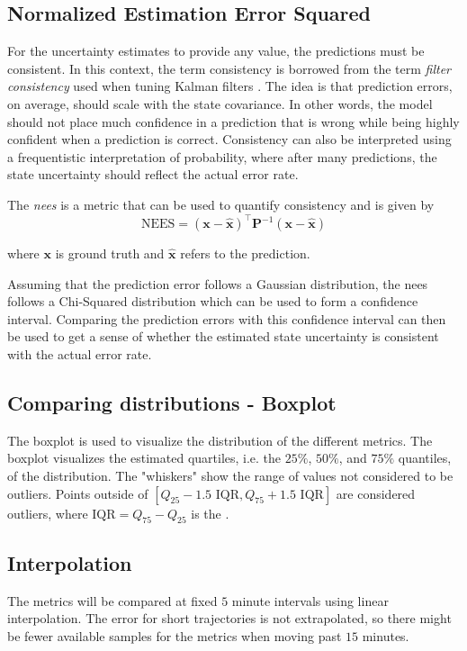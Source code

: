 \subsection{Normalized Estimation Error Squared}
For the uncertainty estimates to provide any value, the predictions must be consistent. In this context, the term consistency is borrowed from the term \textit{filter consistency} used when tuning Kalman filters \cite{sensorfusjon}. The idea is that prediction errors, on average, should scale with the state covariance. In other words, the model should not place much confidence in a prediction that is wrong while being highly confident when a prediction is correct. Consistency can also be interpreted using a frequentistic interpretation of probability, where after many predictions, the state uncertainty should reflect the actual error rate.

The \textit{\acrfull{nees}} is a metric that can be used to quantify consistency and is given by
\begin{equation}
    \text{NEES} = (\boldsymbol{x} - \hat{\boldsymbol{x}})^\intercal \boldsymbol{P}^{-1} (\boldsymbol{x} - \hat{\boldsymbol{x}})
\end{equation}

where $\boldsymbol{x}$ is ground truth and $\hat{\boldsymbol{x}}$ refers to the prediction.

Assuming that the prediction error follows a Gaussian distribution, the \acrshort{nees} follows a Chi-Squared distribution which can be used to form a confidence interval. Comparing the prediction errors with this confidence interval can then be used to get a sense of whether the estimated state uncertainty is consistent with the actual error rate.

\subsection{Comparing distributions - Boxplot}
The boxplot is used to visualize the distribution of the different metrics. The boxplot visualizes the estimated quartiles, i.e. the $25\%$, $50\%$, and $75\%$ quantiles, of the distribution. The "whiskers" show the range of values not considered to be outliers. Points outside of $[Q_{25} - 1.5 \text{ IQR}, Q_{75} + 1.5 \text{ IQR}]$ are considered outliers, where $\text{IQR} = Q_{75} - Q_{25}$ is the  \cite{matplotlib}.  

\subsection{Interpolation}
The metrics will be compared at fixed $5$ minute intervals using linear interpolation. The error for short trajectories is not extrapolated, so there might be fewer available samples for the metrics when moving past $15$ minutes.

